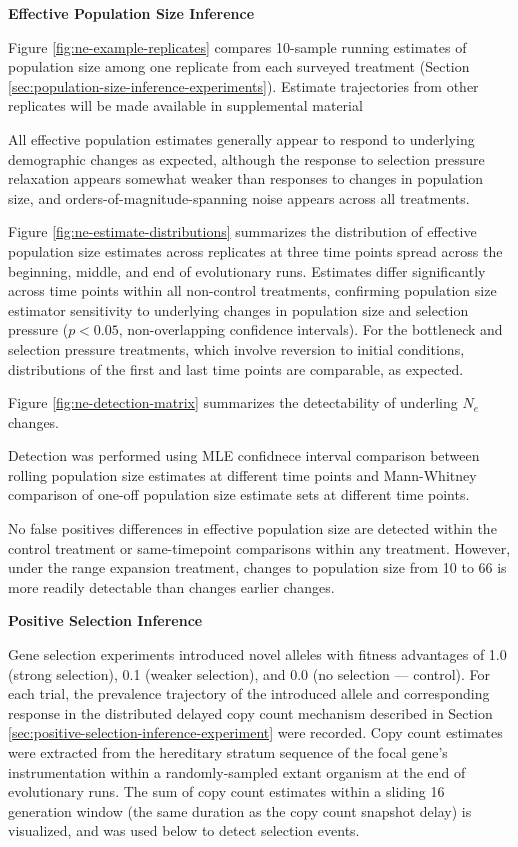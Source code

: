 \textbf{Effective Population Size Inference}

Figure \ref{fig:ne-example-replicates} compares 10-sample running estimates of population size among one replicate from each surveyed treatment (Section \ref{sec:population-size-inference-experiments}).
Estimate trajectories from other replicates will be made available in supplemental material

All effective population estimates generally appear to respond to underlying demographic changes as expected, although the response to selection pressure relaxation appears somewhat weaker than responses to changes in population size, and orders-of-magnitude-spanning noise appears across all treatments.



Figure \ref{fig:ne-estimate-distributions} summarizes the distribution of effective population size estimates across replicates at three time points spread across the beginning, middle, and end of evolutionary runs.
Estimates differ significantly across time points within all non-control treatments, confirming population size estimator sensitivity to underlying changes in population size and selection pressure ($p < 0.05$, non-overlapping confidence intervals).
For the bottleneck and selection pressure treatments, which involve reversion to initial conditions, distributions of the first and last time points are comparable, as expected.



Figure \ref{fig:ne-detection-matrix} summarizes the detectability of underling $N_e$ changes.

Detection was performed using MLE confidnece interval comparison between rolling population size estimates at different time points and Mann-Whitney comparison of one-off population size estimate sets at different time points.

No false positives differences in effective population size are detected within the control treatment or same-timepoint comparisons within any treatment.
However, under the range expansion treatment, changes to population size from 10 to 66 is more readily detectable than changes earlier changes.


\textbf{Positive Selection Inference}

Gene selection experiments introduced novel alleles with fitness advantages of 1.0 (strong selection), 0.1 (weaker selection), and 0.0 (no selection --- control).
For each trial, the prevalence trajectory of the introduced allele and corresponding response in the distributed delayed copy count mechanism described in Section \ref{sec:positive-selection-inference-experiment} were recorded.
Copy count estimates were extracted from the hereditary stratum sequence of the focal gene's instrumentation within a randomly-sampled extant organism at the end of evolutionary runs.
The sum of copy count estimates within a sliding 16 generation window (the same duration as the copy count snapshot delay) is visualized, and was used below to detect selection events.

